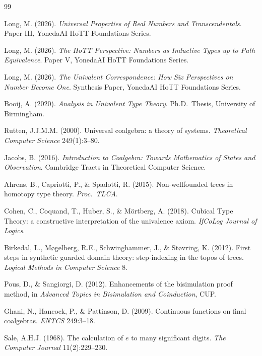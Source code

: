 \documentclass[12pt]{article}
\theoremstyle{definition}
\theoremstyle{remark}
\begin{document}
\begin{thebibliography}{99}

Long, M. (2026). \emph{Universal Properties of Real Numbers and
Transcendentals}. Paper III, YonedaAI HoTT Foundations Series.

Long, M. (2026). \emph{The HoTT Perspective: Numbers as Inductive
Types up to Path Equivalence}. Paper V, YonedaAI HoTT Foundations
Series.

Long, M. (2026). \emph{The Univalent Correspondence: How Six
Perspectives on Number Become One}. Synthesis Paper, YonedaAI
HoTT Foundations Series.

Booij, A. (2020). \emph{Analysis in Univalent Type Theory}.
Ph.D.\ Thesis, University of Birmingham.

Rutten, J.J.M.M. (2000). Universal coalgebra: a theory of
systems. \emph{Theoretical Computer Science} 249(1):3--80.

Jacobs, B. (2016). \emph{Introduction to Coalgebra: Towards
Mathematics of States and Observation}. Cambridge Tracts in
Theoretical Computer Science.

Ahrens, B., Capriotti, P., \& Spadotti, R. (2015). Non-wellfounded
trees in homotopy type theory. \emph{Proc.\ TLCA}.

Cohen, C., Coquand, T., Huber, S., \& M\"ortberg, A. (2018).
Cubical Type Theory: a constructive interpretation of the
univalence axiom. \emph{IfCoLog Journal of Logics}.

Birkedal, L., M{\o}gelberg, R.E., Schwinghammer, J., \&
St{\o}vring, K. (2012). First steps in synthetic guarded
domain theory: step-indexing in the topos of trees.
\emph{Logical Methods in Computer Science} 8.

Pous, D., \& Sangiorgi, D. (2012). Enhancements of the
bisimulation proof method, in \emph{Advanced Topics in
Bisimulation and Coinduction}, CUP.

Ghani, N., Hancock, P., \& Pattinson, D. (2009). Continuous
functions on final coalgebras. \emph{ENTCS} 249:3--18.

Sale, A.H.J. (1968). The calculation of $e$ to many significant
digits. \emph{The Computer Journal} 11(2):229--230.


\end{thebibliography}
\end{document}
